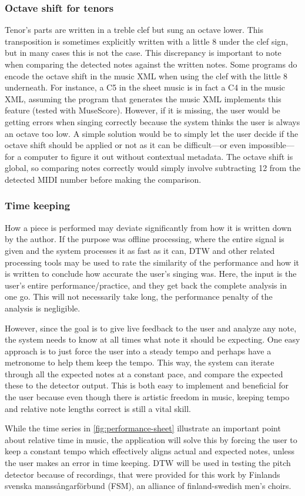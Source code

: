 \subsubsection{Octave shift for tenors}
Tenor's parts are written in a treble clef but sung an octave lower. This transposition is sometimes explicitly written with a little 8 under the clef sign, but in many cases this is not the case. This discrepancy is important to note when comparing the detected notes against the written notes. Some programs do encode the octave shift in the music XML when using the clef with the little 8 underneath. For instance, a C5 in the sheet music is in fact a C4 in the music XML, assuming the program that generates the music XML implements this feature (tested with MuseScore). However, if it is missing, the user would be getting errors when singing correctly because the system thinks the user is always an octave too low. A simple solution would be to simply let the user decide if the octave shift should be applied or not as it can be difficult—or even impossible—for a computer to figure it out without contextual metadata. The octave shift is global, so comparing notes correctly would simply involve subtracting 12 from the detected MIDI number before making the comparison.

\subsubsection{Time keeping}
How a piece is performed may deviate significantly from how it is written down by the author. If the purpose was offline processing, where the entire signal is given and the system processes it as fast as it can, DTW and other related processing tools may be used to rate the similarity of the performance and how it is written to conclude how accurate the user's singing was. Here, the input is the user's entire performance/practice, and they get back the complete analysis in one go. This will not necessarily take long, the performance penalty of the analysis is negligible.

However, since the goal is to give live feedback to the user and analyze any note, the system needs to know at all times what note it should be expecting. One easy approach is to just force the user into a steady tempo and perhaps have a metronome to help them keep the tempo. This way, the system can iterate through all the expected notes at a constant pace, and compare the expected these to the detector output. This is both easy to implement and beneficial for the user because even though there is artistic freedom in music, keeping tempo and relative note lengths correct is still a vital skill. 

While the time series in \ref{fig:performance-sheet} illustrate an important point about relative time in music, the application will solve this by forcing the user to keep a constant tempo which effectively aligns actual and expected notes, unless the user makes an error in time keeping. DTW will be used in testing the pitch detector because of recordings, that were provided for this work by Finlands svenska manssångarförbund (FSM), an alliance of finland-swedish men's choirs. 
